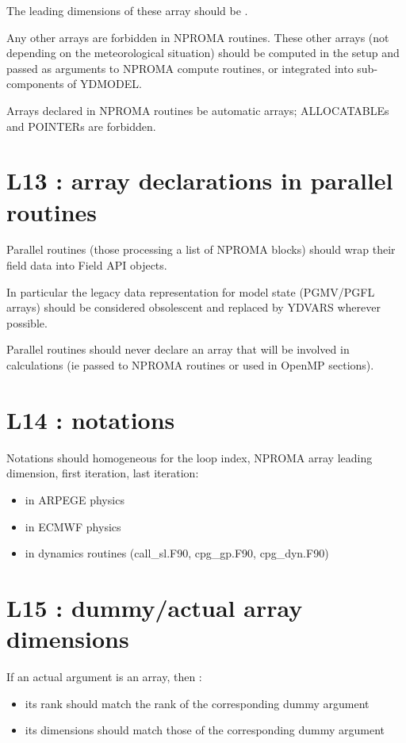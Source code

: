 \documentclass[letterpaper,10pt,english]{sphinxmanual}
\begin{document}
The leading dimensions of these array should be .

Any other arrays are forbidden in NPROMA routines. These other arrays (not depending on
the meteorological situation) should be computed in the setup and passed as arguments
to NPROMA compute routines, or integrated into sub-components of YDMODEL.

Arrays declared in NPROMA routines be automatic arrays; ALLOCATABLEs and POINTERs are
forbidden.


\section{L13 : array declarations in parallel routines}
\label{\detokenize{rules/L13:l13-array-declarations-in-parallel-routines}}\label{\detokenize{rules/L13::doc}}
Parallel routines (those processing a list of NPROMA blocks) should wrap their field data
into Field API objects.

In particular the legacy data representation for model state (PGMV/PGFL arrays) should be
considered obsolescent and replaced by YDVARS wherever possible.

Parallel routines should never declare an array that will be involved in calculations
(ie passed to NPROMA routines or used in OpenMP sections).


\section{L14 : notations}
\label{\detokenize{rules/L14:l14-notations}}\label{\detokenize{rules/L14::doc}}
Notations should homogeneous for the loop index, NPROMA array leading dimension, first iteration, last iteration:
\begin{itemize}
\item {} 
 in ARPEGE physics

\item {} 
 in ECMWF physics

\item {} 
 in dynamics routines (call\_sl.F90, cpg\_gp.F90, cpg\_dyn.F90)

\end{itemize}


\section{L15 : dummy/actual array dimensions}
\label{\detokenize{rules/L15:l15-dummy-actual-array-dimensions}}\label{\detokenize{rules/L15::doc}}
If an actual argument is an array, then :
\begin{itemize}
\item {} 
its rank should match the rank of the corresponding dummy argument

\item {} 
its dimensions should match those of the corresponding dummy argument

\end{itemize}
\end{document}
